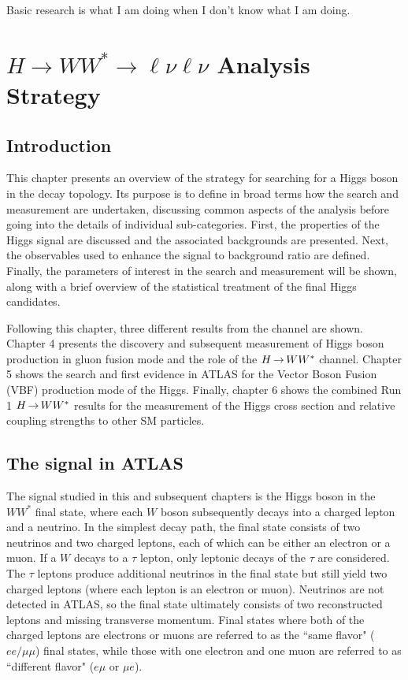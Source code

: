 \begin{savequote}[75mm]
Basic research is what I am doing when I don't know what I am doing.
\end{savequote}

\chapter{$H\rightarrow WW^{*}\rightarrow \ell\nu\ell\nu$ Analysis Strategy}
\label{chap:hwwstrategy}

\section{Introduction}

This chapter presents an overview of the strategy for searching for a Higgs boson in the 
\HWWfull decay topology. Its purpose is to define in broad terms how the search and measurement are undertaken, discussing common aspects of the analysis before going into the details of individual sub-categories. First, the properties of the Higgs signal are discussed and the associated backgrounds are
presented. Next, the observables used to enhance the signal to background ratio are defined. 
Finally, the parameters of interest in the search and measurement will be shown, 
along with a brief overview of the statistical treatment of the final Higgs candidates.

Following this chapter, three different results from the \HWWfull channel are shown. Chapter 4 presents the discovery and subsequent measurement of Higgs boson production in gluon fusion mode and the role of the $H{\,{\rightarrow}\,}WW^\ast$ channel. Chapter 5 shows the search and first evidence in ATLAS for the Vector Boson Fusion (VBF) production mode of the Higgs. Finally, chapter 6 shows the combined Run 1 $H{\,{\rightarrow}\,}WW^\ast$ results for the measurement of the Higgs cross section and relative coupling strengths to other SM particles. 

\section{The \HWWfull signal in ATLAS}

\label{sec:sigtopology}

The signal studied in this and subsequent chapters is the Higgs boson in the $WW^*$ final state,
where each $W$ boson subsequently decays into a charged lepton and a neutrino. In the simplest decay path, the final state consists of two neutrinos and two charged leptons, each of which can be either an electron or a muon. If a $W$ decays to a $\tau$ lepton, only leptonic decays of the $\tau$ are considered. The $\tau$ leptons produce additional neutrinos in the final state but still yield two charged leptons (where each lepton is an electron or muon). Neutrinos are not detected in ATLAS, so the final state ultimately consists of two reconstructed leptons and missing transverse momentum. Final states where both of the charged leptons are electrons or muons are referred to as the ``same flavor" ($ee/\mu\mu$) final states, while those with one electron and one muon are referred to as ``different flavor" ($e\mu$ or $\mu e$).

